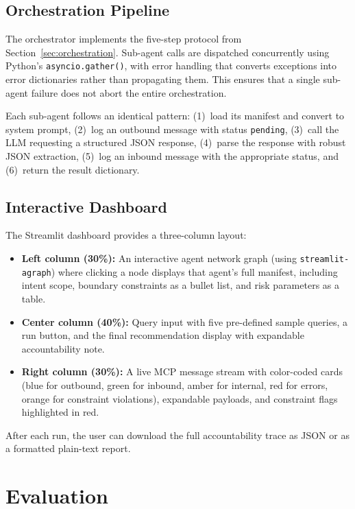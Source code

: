 \documentclass[runningheads]{llncs}
\begin{document}
\subsection{Orchestration Pipeline}

The orchestrator implements the five-step protocol from Section~\ref{sec:orchestration}. Sub-agent calls are dispatched concurrently using Python's \texttt{asyncio.gather()}, with error handling that converts exceptions into error dictionaries rather than propagating them. This ensures that a single sub-agent failure does not abort the entire orchestration.

Each sub-agent follows an identical pattern: (1)~load its manifest and convert to system prompt, (2)~log an outbound message with status \texttt{pending}, (3)~call the LLM requesting a structured JSON response, (4)~parse the response with robust JSON extraction, (5)~log an inbound message with the appropriate status, and (6)~return the result dictionary.

\subsection{Interactive Dashboard}

The Streamlit dashboard provides a three-column layout:
\begin{itemize}
    \item \textbf{Left column (30\%):} An interactive agent network graph (using \texttt{streamlit-agraph}) where clicking a node displays that agent's full manifest, including intent scope, boundary constraints as a bullet list, and risk parameters as a table.
    \item \textbf{Center column (40\%):} Query input with five pre-defined sample queries, a run button, and the final recommendation display with expandable accountability note.
    \item \textbf{Right column (30\%):} A live MCP message stream with color-coded cards (blue for outbound, green for inbound, amber for internal, red for errors, orange for constraint violations), expandable payloads, and constraint flags highlighted in red.
\end{itemize}

After each run, the user can download the full accountability trace as JSON or as a formatted plain-text report.

\section{Evaluation}
\label{sec:evaluation}
\end{document}

